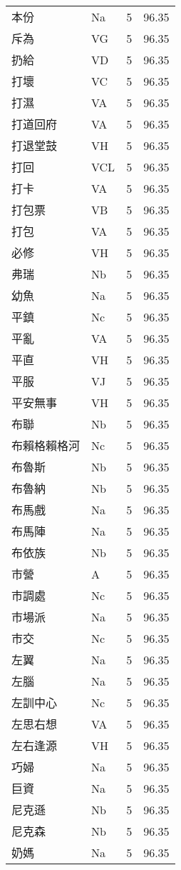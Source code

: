\documentclass[twocolumn]{book}
\begin{document}
\begin{supertabular}{llrr}
本份 & Na & 5 &  96.35\\
斥為 & VG & 5 &  96.35\\
扔給 & VD & 5 &  96.35\\
打壞 & VC & 5 &  96.35\\
打濕 & VA & 5 &  96.35\\
打道回府 & VA & 5 &  96.35\\
打退堂鼓 & VH & 5 &  96.35\\
打回 & VCL & 5 &  96.35\\
打卡 & VA & 5 &  96.35\\
打包票 & VB & 5 &  96.35\\
打包 & VA & 5 &  96.35\\
必修 & VH & 5 &  96.35\\
弗瑞 & Nb & 5 &  96.35\\
幼魚 & Na & 5 &  96.35\\
平鎮 & Nc & 5 &  96.35\\
平亂 & VA & 5 &  96.35\\
平直 & VH & 5 &  96.35\\
平服 & VJ & 5 &  96.35\\
平安無事 & VH & 5 &  96.35\\
布聯 & Nb & 5 &  96.35\\
布賴格賴格河 & Nc & 5 &  96.35\\
布魯斯 & Nb & 5 &  96.35\\
布魯納 & Nb & 5 &  96.35\\
布馬戲 & Na & 5 &  96.35\\
布馬陣 & Na & 5 &  96.35\\
布依族 & Nb & 5 &  96.35\\
市營 & A & 5 &  96.35\\
市調處 & Nc & 5 &  96.35\\
市場派 & Na & 5 &  96.35\\
市交 & Nc & 5 &  96.35\\
左翼 & Na & 5 &  96.35\\
左腦 & Na & 5 &  96.35\\
左訓中心 & Nc & 5 &  96.35\\
左思右想 & VA & 5 &  96.35\\
左右逢源 & VH & 5 &  96.35\\
巧婦 & Na & 5 &  96.35\\
巨資 & Na & 5 &  96.35\\
尼克遜 & Nb & 5 &  96.35\\
尼克森 & Nb & 5 &  96.35\\
奶媽 & Na & 5 &  96.35\\

\end{supertabular}
\end{document}
